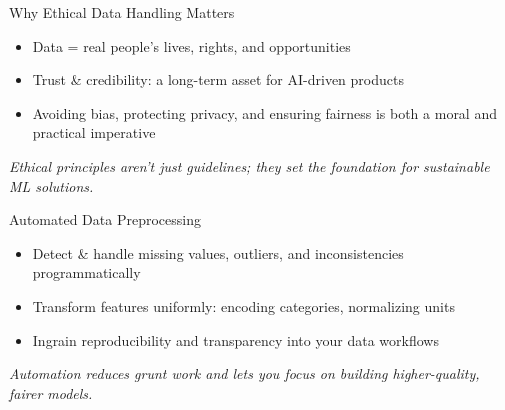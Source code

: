 \documentclass[aspectratio=169]{beamer}
\begin{document}
%
\begin{frame}{Why Ethical Data Handling Matters}
\begin{itemize}
\item Data = real people’s lives, rights, and opportunities
\item Trust \& credibility: a long-term asset for AI-driven products
\item Avoiding bias, protecting privacy, and ensuring fairness is both a moral and practical imperative
\end{itemize}

\emph{Ethical principles aren’t just guidelines; they set the foundation for sustainable ML solutions.}
\end{frame}

%
\begin{frame}{Automated Data Preprocessing}
\begin{itemize}
\item Detect \& handle missing values, outliers, and inconsistencies programmatically
\item Transform features uniformly: encoding categories, normalizing units
\item Ingrain reproducibility and transparency into your data workflows
\end{itemize}

\emph{Automation reduces grunt work and lets you focus on building higher-quality, fairer models.}
\end{frame}
\end{document}
